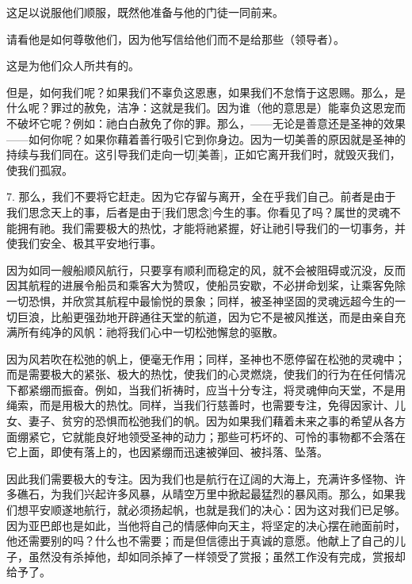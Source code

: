 这足以说服他们顺服，既然他准备与他的门徒一同前来。\par

请看他是如何尊敬他们，因为他写信给他们而不是给那些（领导者）。\par

这是为他们众人所共有的。\par

但是，如何我们呢？如果我们不辜负这恩惠，如果我们不怠惰于这恩赐。那么，是什么呢？罪过的赦免，洁净：这就是我们。因为谁（他的意思是）能辜负这恩宠而不破坏它呢？例如：祂白白赦免了你的罪。那么，——无论是善意还是圣神的效果——如何你呢？如果你藉着善行吸引它到你身边。因为一切美善的原因就是圣神的持续与我们同在。这引导我们走向一切[美善]，正如它离开我们时，就毁灭我们，使我们孤寂。\par

7. 那么，我们不要将它赶走。因为它存留与离开，全在乎我们自己。前者是由于我们思念天上的事，后者是由于[我们思念]今生的事。你看见了吗？属世的灵魂不能拥有祂。我们需要极大的热忱，才能将祂紧握，好让祂引导我们的一切事务，并使我们安全、极其平安地行事。\par

因为如同一艘船顺风航行，只要享有顺利而稳定的风，就不会被阻碍或沉没，反而因其航程的进展令船员和乘客大为赞叹，使船员安歇，不必拼命划桨，让乘客免除一切恐惧，并欣赏其航程中最愉悦的景象；同样，被圣神坚固的灵魂远超今生的一切巨浪，比船更强劲地开辟通往天堂的航道，因为它不是被风推送，而是由亲自充满所有纯净的风帆：祂将我们心中一切松弛懈怠的驱散。\par

因为风若吹在松弛的帆上，便毫无作用；同样，圣神也不愿停留在松弛的灵魂中；而是需要极大的紧张、极大的热忱，使我们的心灵燃烧，使我们的行为在任何情况下都紧绷而振奋。例如，当我们祈祷时，应当十分专注，将灵魂伸向天堂，不是用绳索，而是用极大的热忱。同样，当我们行慈善时，也需要专注，免得因家计、儿女、妻子、贫穷的恐惧而松弛我们的帆。因为如果我们藉着未来之事的希望从各方面绷紧它，它就能良好地领受圣神的动力；那些可朽坏的、可怜的事物都不会落在它上面，即使有落上的，也因紧绷而迅速被弹回、被抖落、坠落。\par

因此我们需要极大的专注。因为我们也是航行在辽阔的大海上，充满许多怪物、许多礁石，为我们兴起许多风暴，从晴空万里中掀起最猛烈的暴风雨。那么，如果我们想平安顺遂地航行，就必须扬起帆，也就是我们的决心：因为这对我们已足够。因为亚巴郎也是如此，当他将自己的情感伸向天主，将坚定的决心摆在祂面前时，他还需要别的吗？什么也不需要；而是但信德出于真诚的意愿。他献上了自己的儿子，虽然没有杀掉他，却如同杀掉了一样领受了赏报；虽然工作没有完成，赏报却给予了。\par


